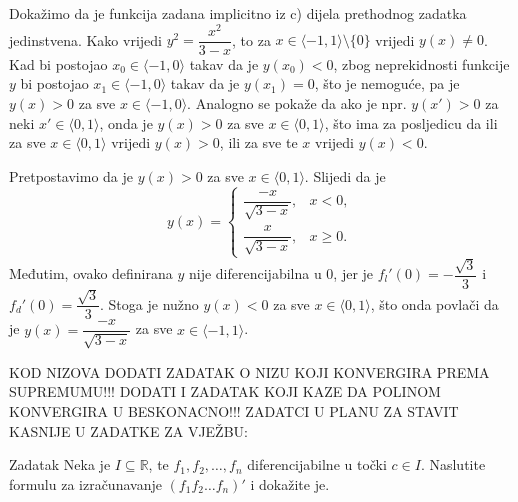 \begin{remark}
\label{uniquenessofimplicitfunction}
Dokažimo da je funkcija zadana implicitno iz c) dijela prethodnog zadatka jedinstvena. Kako vrijedi $y^2=\dfrac{x^2}{3-x}$, to za $x\in \langle -1, 1\rangle\setminus\{0\}$ vrijedi $y(x)\neq 0$. Kad bi postojao $x_0\in \langle -1, 0\rangle$ takav da je $y(x_0)<0$, zbog neprekidnosti funkcije $y$ bi postojao $x_1\in \langle -1, 0\rangle$ takav da je $y(x_1)=0$, što je nemoguće, pa je $y(x)>0$ za sve $x\in \langle -1, 0\rangle$. Analogno se pokaže da ako je npr. $y(x')>0$ za neki $x'\in \langle 0, 1\rangle$, onda je $y(x)>0$ za sve $x\in \langle 0, 1\rangle$, što ima za posljedicu da ili za sve $x\in \langle 0, 1\rangle$ vrijedi $y(x)>0$, ili za sve te $x$ vrijedi $y(x)<0$.

Pretpostavimo da je $y(x)>0$ za sve $x\in \langle 0, 1\rangle$. Slijedi da je
$$y(x)=\begin{cases}
\dfrac{-x}{\sqrt{3-x}}, & x<0,\\
\dfrac{x}{\sqrt{3-x}}, & x\geq 0.
\end{cases}$$
Međutim, ovako definirana $y$ nije diferencijabilna u $0$, jer je $f_l'(0)=-\dfrac{\sqrt{3}}{3}$ i $f_d'(0)=\dfrac{\sqrt{3}}{3}$. Stoga je nužno $y(x)<0$ za sve $x\in \langle 0, 1\rangle$, što onda povlači da je $y(x)=\dfrac{-x}{\sqrt{3-x}}$ za sve $x\in \langle -1, 1\rangle$.
\end{remark}
KOD NIZOVA DODATI ZADATAK O NIZU KOJI KONVERGIRA PREMA SUPREMUMU!!! DODATI I ZADATAK KOJI KAZE DA POLINOM KONVERGIRA U BESKONACNO!!!
ZADATCI U PLANU ZA STAVIT KASNIJE U ZADATKE ZA VJEŽBU:
\begin{exercise}{Zadatak}
Neka je $I\subseteq \mathbb{R}$, te $f_1, f_2, \dots, f_n$ diferencijabilne u točki $c\in I$. Naslutite formulu za izračunavanje $\left(f_1f_2\dots f_n\right)'$ i dokažite je.
\end{exercise}
